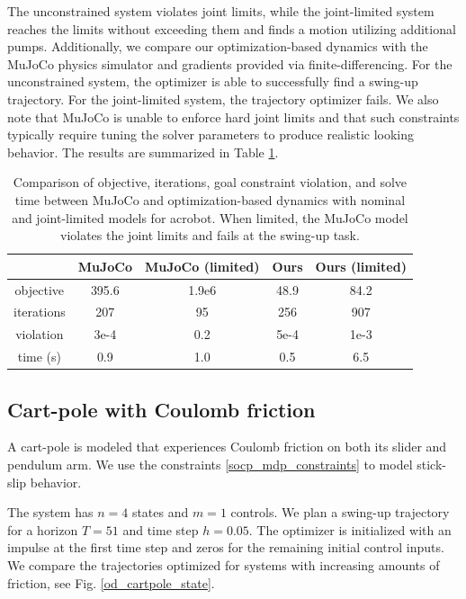 The unconstrained system violates joint limits, while the joint-limited system reaches the limits without exceeding them and finds a motion utilizing additional pumps. Additionally, we compare our optimization-based dynamics with the MuJoCo physics simulator and gradients provided via finite-differencing. For the unconstrained system, the optimizer is able to successfully find a swing-up trajectory. For the joint-limited system, the trajectory optimizer fails. We also note that MuJoCo is unable to enforce hard joint limits and that such constraints typically require tuning the solver parameters to produce realistic looking behavior. The results are summarized in Table \ref{od_acrobot_results}.

\begin{table}[H]
	\centering
	\caption[Numerical results for acrobot swing-up]{Comparison of objective, iterations, goal constraint violation, and solve time between MuJoCo and optimization-based dynamics with nominal and joint-limited models for acrobot. When limited, the MuJoCo model violates the joint limits and fails at the swing-up task.}
	\begin{tabular}{c c c c c}
		\toprule
		&
		\textbf{MuJoCo} &
		\textbf{MuJoCo (limited)} &
		\textbf{Ours} &
		\textbf{Ours (limited)} \\
		\toprule
		objective & 395.6 & 1.9e{6} & 48.9 & 84.2 \\
		iterations & 207  & 95 & 256 & 907 \\
		violation & 3e{-}4 & 0.2 & 5e{-}4 & 1e{-}3\\
		time (s) & 0.9 & 1.0 & 0.5 & 6.5\\
		\toprule
	\end{tabular}
	\label{od_acrobot_results}
\end{table}

\subsection{Cart-pole with Coulomb friction}

A cart-pole \cite{tedrake2014underactuated} is modeled that experiences Coulomb friction \cite{moreau2011unilateral} on both its slider and pendulum arm. We use the constraints \eqref{socp_mdp_constraints} to model stick-slip behavior.

The system has $n = 4$ states and $m = 1$ controls. We plan a swing-up trajectory for a horizon $T = 51$ and time step $h = 0.05$. The optimizer is initialized with an impulse at the first time step and zeros for the remaining initial control inputs. We compare the trajectories optimized for systems with increasing amounts of friction, see Fig. \ref{od_cartpole_state}. 

